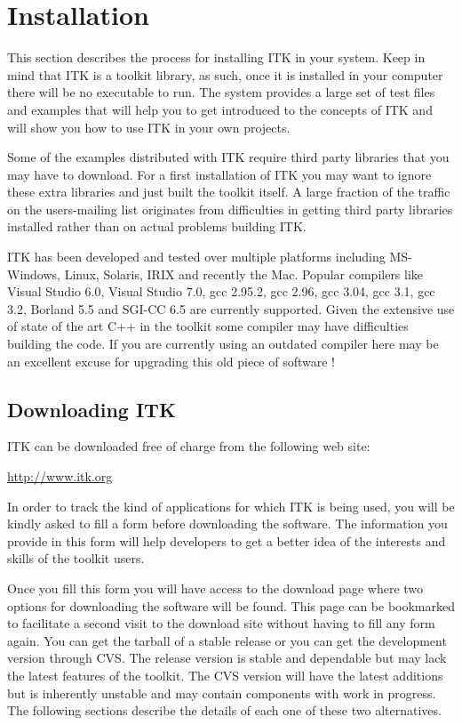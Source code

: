 \chapter{Installation}
\label{chapter:Installation}


This section describes the process for installing ITK in your system. Keep in
mind that ITK is a toolkit library, as such, once it is installed in your
computer there will be no executable to run. The system provides a large set of
test files and examples that will help you to get introduced to the concepts of
ITK and will show you how to use ITK in your own projects.

Some of the examples distributed with ITK require third party libraries that
you may have to download. For a first installation of ITK you may want to
ignore these extra libraries and just built the toolkit itself. A large
fraction of the traffic on the users-mailing list originates from difficulties
in getting third party libraries installed rather than on actual problems
building ITK.

ITK has been developed and tested over multiple platforms including MS-Windows,
Linux, Solaris, IRIX and recently the Mac. Popular compilers like Visual Studio
6.0, Visual Studio 7.0, gcc 2.95.2, gcc 2.96, gcc 3.04, gcc 3.1, gcc 3.2,
Borland 5.5 and SGI-CC 6.5 are currently supported. Given the extensive use of
state of the art C++ in the toolkit some compiler may have difficulties
building the code. If you are currently using an outdated compiler here may be
an excellent excuse for upgrading this old piece of software !


\section{Downloading ITK}
\label{sec:DownloadingITK}
 

ITK can be downloaded free of charge from the following web site:
\begin{center} 
  \url{http://www.itk.org}
\end{center}
In order to track the kind of applications for which ITK is being used, you
will be kindly asked to fill a form before downloading the software.
The information you provide in this form will help developers to get a better
idea of the interests and skills of the toolkit users. 

Once you fill this form you will have access to the download page where two
options for downloading the software will be found. This page can be bookmarked
to facilitate a second visit to the download site without having to fill any
form again. You can get the tarball of a stable release or you can get the
development version through CVS.  The release version is stable and dependable
but may lack the latest features of the toolkit. The CVS version will have the
latest additions but is inherently unstable and may contain components with
work in progress.  The following sections describe the details of each one of
these two alternatives.

